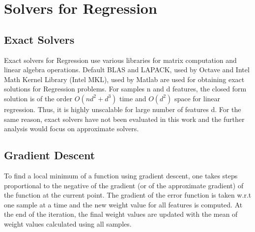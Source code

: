 \documentclass{sigplanconf}
\begin{document}
\section{Solvers for Regression}
\subsection{Exact Solvers}
Exact solvers for Regression use various libraries for matrix computation and linear algebra operations.
Default BLAS \cite{blas} and LAPACK, used by Octave and Intel Math Kernel Library (Intel MKL), used by Matlab
are used for obtaining exact solutions for Regression problems. For samples n and d features, the closed form
solution is of the order \begin {math} O(nd^2 + d^3) \end {math} time and \begin {math} O(d^2) \end {math} space for linear regression.
Thus, it is highly unscalable for large number of features d. For the same reason, exact solvers have not been
evaluated in this work and the further analysis would focus on approximate solvers.

\subsection{Gradient Descent}
To find a local minimum of a function using gradient descent, one takes steps proportional to the negative of 
the gradient (or of the approximate gradient) of the function at the current point. The gradient of the error 
function is taken w.r.t one sample at a time and the new weight value for all features is computed.
At the end of the iteration, the final weight values are updated with the mean of weight values calculated using all samples.
\end{document}
